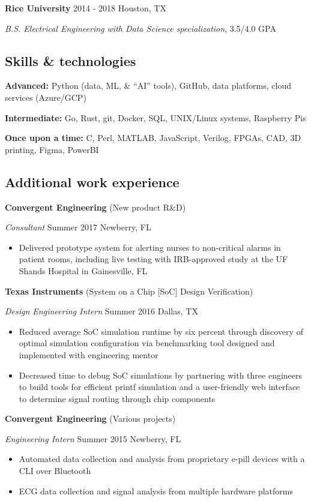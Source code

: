 \documentclass[
  10pt,
  letterpaper,
  DIV=11,
  numbers=noendperiod]{scrartcl}
\providecommand{\tightlist}{%
  \setlength{\itemsep}{0pt}\setlength{\parskip}{0pt}}\usepackage{longtable,booktabs,array}
\begin{document}
\textbf{Rice University} \textbar{} 2014 - 2018 \textbar{} Houston, TX

\emph{B.S. Electrical Engineering with Data Science specialization},
3.5/4.0 GPA

\subsection{Skills \& technologies}\label{skills-technologies}

\textbf{Advanced:} Python (data, ML, \& ``AI'' tools), GitHub, data
platforms, cloud services (Azure/GCP)

\textbf{Intermediate:} Go, Rust, git, Docker, SQL, UNIX/Linux systems,
Raspberry Pis

\textbf{Once upon a time:} C, Perl, MATLAB, JavaScript, Verilog, FPGAs,
CAD, 3D printing, Figma, PowerBI

\newpage{}

\subsection{Additional work
experience}\label{additional-work-experience}

\textbf{Convergent Engineering} \textbar{} (New product R\&D)

\emph{Consultant} \textbar{} Summer 2017 \textbar{} Newberry, FL

\begin{itemize}
\tightlist
\item
  Delivered prototype system for alerting nurses to non-critical alarms
  in patient rooms, including live testing with IRB-approved study at
  the UF Shands Hospital in Gainesville, FL
\end{itemize}

\textbf{Texas Instruments} (System on a Chip {[}SoC{]} Design
Verification)

\emph{Design Engineering Intern} \textbar{} Summer 2016 \textbar{}
Dallas, TX

\begin{itemize}
\tightlist
\item
  Reduced average SoC simulation runtime by six percent through
  discovery of optimal simulation configuration via benchmarking tool
  designed and implemented with engineering mentor
\item
  Decreased time to debug SoC simulations by partnering with three
  engineers to build tools for efficient printf simulation and a
  user-friendly web interface to determine signal routing through chip
  components
\end{itemize}

\textbf{Convergent Engineering} (Various projects)

\emph{Engineering Intern} \textbar{} Summer 2015 \textbar{} Newberry, FL

\begin{itemize}
\tightlist
\item
  Automated data collection and analysis from proprietary e-pill devices
  with a CLI over Bluetooth
\item
  ECG data collection and signal analysis from multiple hardware
  platforms
\end{itemize}
\end{document}

